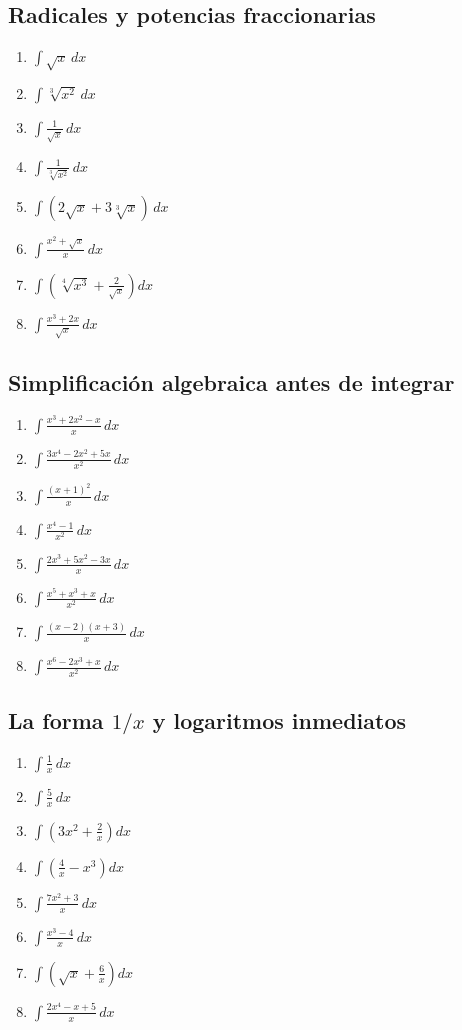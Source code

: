 \documentclass[12pt]{article}
\theoremstyle{definition}
\theoremstyle{remark}
\begin{document}
\subsection{Radicales y potencias fraccionarias}
\begin{enumerate}[label=\arabic*.,start=17]
\item $\displaystyle \int \sqrt{x}\,dx$
\item $\displaystyle \int \sqrt[3]{x^2}\,dx$
\item $\displaystyle \int \frac{1}{\sqrt{x}}\,dx$
\item $\displaystyle \int \frac{1}{\sqrt[3]{x^2}}\,dx$
\item $\displaystyle \int(2\sqrt{x}+3\sqrt[3]{x})\,dx$
\item $\displaystyle \int\frac{x^2+\sqrt{x}}{x}\,dx$
\item $\displaystyle \int\left(\sqrt[4]{x^3}+\frac{2}{\sqrt{x}}\right)dx$
\item $\displaystyle \int\frac{x^3+2x}{\sqrt{x}}\,dx$
\end{enumerate}

\subsection{Simplificación algebraica antes de integrar}
\begin{enumerate}[label=\arabic*.,start=25]
\item $\displaystyle \int\frac{x^3+2x^2-x}{x}\,dx$
\item $\displaystyle \int\frac{3x^4-2x^2+5x}{x^2}\,dx$
\item $\displaystyle \int\frac{(x+1)^2}{x}\,dx$
\item $\displaystyle \int\frac{x^4-1}{x^2}\,dx$
\item $\displaystyle \int\frac{2x^3+5x^2-3x}{x}\,dx$
\item $\displaystyle \int\frac{x^5+x^3+x}{x^2}\,dx$
\item $\displaystyle \int\frac{(x-2)(x+3)}{x}\,dx$
\item $\displaystyle \int\frac{x^6-2x^3+x}{x^2}\,dx$
\end{enumerate}

\subsection{La forma $1/x$ y logaritmos inmediatos}
\begin{enumerate}[label=\arabic*.,start=33]
\item $\displaystyle \int\frac{1}{x}\,dx$
\item $\displaystyle \int\frac{5}{x}\,dx$
\item $\displaystyle \int\left(3x^2+\frac{2}{x}\right)dx$
\item $\displaystyle \int\left(\frac{4}{x}-x^3\right)dx$
\item $\displaystyle \int\frac{7x^2+3}{x}\,dx$
\item $\displaystyle \int\frac{x^3-4}{x}\,dx$
\item $\displaystyle \int\left(\sqrt{x}+\frac{6}{x}\right)dx$
\item $\displaystyle \int\frac{2x^4-x+5}{x}\,dx$
\end{enumerate}
\end{document}
